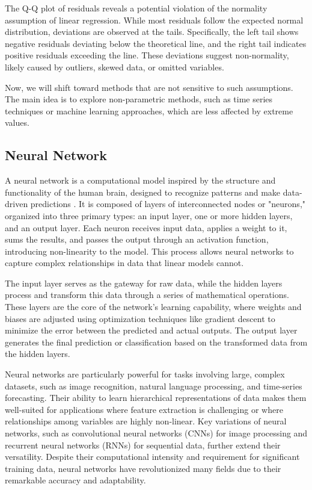 \documentclass[english,12pt, titlepage]{article}
\begin{document}
	The Q-Q plot of residuals reveals a potential violation of the normality assumption of linear regression. While most residuals follow the expected normal distribution, deviations are observed at the tails. Specifically, the left tail shows negative residuals deviating below the theoretical line, and the right tail indicates positive residuals exceeding the line. These deviations suggest non-normality, likely caused by outliers, skewed data, or omitted variables.
	
	Now, we will shift toward methods that are not sensitive to such assumptions. The main idea is to explore non-parametric methods, such as time series techniques or machine learning approaches, which are less affected by extreme values.
	
	\subsection{Neural Network}
	
	A neural network is a computational model inspired by the structure and functionality of the human brain, designed to recognize patterns and make data-driven predictions \cite{slim}. It is composed of layers of interconnected nodes or "neurons," organized into three primary types: an input layer, one or more hidden layers, and an output layer. Each neuron receives input data, applies a weight to it, sums the results, and passes the output through an activation function, introducing non-linearity to the model. This process allows neural networks to capture complex relationships in data that linear models cannot.
	
	The input layer serves as the gateway for raw data, while the hidden layers process and transform this data through a series of mathematical operations. These layers are the core of the network's learning capability, where weights and biases are adjusted using optimization techniques like gradient descent to minimize the error between the predicted and actual outputs. The output layer generates the final prediction or classification based on the transformed data from the hidden layers.
	
	Neural networks are particularly powerful for tasks involving large, complex datasets, such as image recognition, natural language processing, and time-series forecasting. Their ability to learn hierarchical representations of data makes them well-suited for applications where feature extraction is challenging or where relationships among variables are highly non-linear. Key variations of neural networks, such as convolutional neural networks (CNNs) for image processing and recurrent neural networks (RNNs) for sequential data, further extend their versatility. Despite their computational intensity and requirement for significant training data, neural networks have revolutionized many fields due to their remarkable accuracy and adaptability.
	
\end{document}

